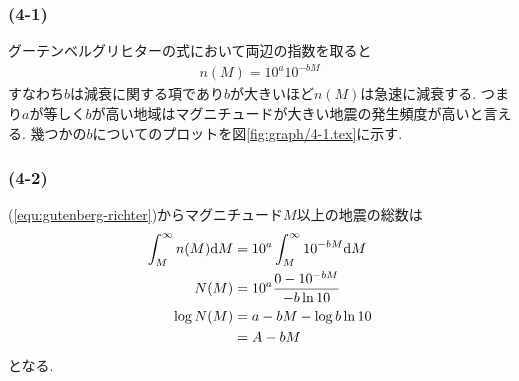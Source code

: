 \subsubsection*{(4-1)}
グーテンベルグリヒターの式において両辺の指数を取ると
\begin{align}
  \label{equ:gutenberg-richter}
  n(M)=10^a10^{-bM}
\end{align}
すなわち$b$は減衰に関する項であり$b$が大きいほど$n(M)$は急速に減衰する.
つまり$a$が等しく$b$が高い地域はマグニチュードが大きい地震の発生頻度が高いと言える.
幾つかの$b$についてのプロットを図\ref{fig:graph/4-1.tex}に示す.
\subsubsection*{(4-2)}
(\ref{equ:gutenberg-richter})からマグニチュード$M$以上の地震の総数は
\begin{align}
  \begin{split}
    \int^\infty_Mn(M){\rm d}M&=10^a\int^\infty_M10^{-bM}{\rm d}M\\
    N(M)&=10^a\frac{0-10^{-bM}}{-b\ln 10}\\
    \log N(M)&=a-bM-\log b\ln 10\\
    &=A-bM
  \end{split}
\end{align}
となる.